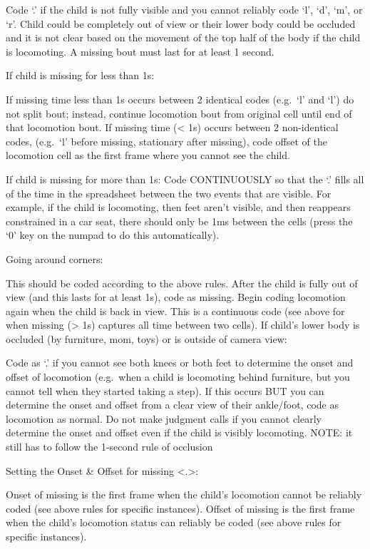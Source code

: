 \documentclass[
  12pt,
]{book}
\begin{document}
Code `.' if the child is not fully visible and you cannot reliably code `l', `d', `m', or `r'. Child could be completely out of view or their lower body could be occluded and it is not clear based on the movement of the top half of the body if the child is locomoting. A missing bout must last for at least 1 second.

If child is missing for less than 1s:

If missing time less than 1s occurs between 2 identical codes (e.g.~`l' and `l') do not split bout; instead, continue locomotion bout from original cell until end of that locomotion bout.
If missing time (\textless{} 1s) occurs between 2 non-identical codes, (e.g.~`l' before missing, stationary after missing), code offset of the locomotion cell as the first frame where you cannot see the child.

If child is missing for more than 1s:
Code CONTINUOUSLY so that the `.' fills all of the time in the spreadsheet between the two events that are visible. For example, if the child is locomoting, then feet aren't visible, and then reappears constrained in a car seat, there should only be 1ms between the cells (press the `0' key on the numpad to do this automatically).

Going around corners:

This should be coded according to the above rules. After the child is fully out of view (and this lasts for at least 1s), code as missing. Begin coding locomotion again when the child is back in view. This is a continuous code (see above for when missing (\textgreater{} 1s) captures all time between two cells).
If child's lower body is occluded (by furniture, mom, toys) or is outside of camera view:

Code as `.' if you cannot see both knees or both feet to determine the onset and offset of locomotion (e.g.~when a child is locomoting behind furniture, but you cannot tell when they started taking a step). If this occurs BUT you can determine the onset and offset from a clear view of their ankle/foot, code as locomotion as normal. Do not make judgment calls if you cannot clearly determine the onset and offset even if the child is visibly locomoting. NOTE: it still has to follow the 1-second rule of occlusion

Setting the Onset \& Offset for missing \textless.\textgreater:

Onset of missing is the first frame when the child's locomotion cannot be reliably coded (see above rules for specific instances).
Offset of missing is the first frame when the child's locomotion status can reliably be coded (see above rules for specific instances).
\end{document}
